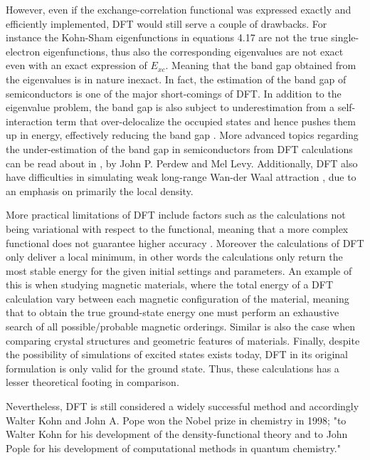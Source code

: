 However, even if the exchange-correlation functional was expressed exactly and efficiently implemented, DFT would still serve a couple of drawbacks. For instance the Kohn-Sham eigenfunctions in equations 4.17 are not the true single-electron eigenfunctions, thus also the corresponding eigenvalues are not exact even with an exact expression of $E_{xc}$. Meaning that the band gap obtained from the eigenvalues is in nature inexact. In fact, the estimation of the band gap of semiconductors is one of the major short-comings of DFT. In addition to the eigenvalue problem, the band gap is also subject to underestimation from a self-interaction term that over-delocalize the occupied states and hence pushes them up in energy, effectively reducing the band gap \cite{dft_limitations}. More advanced topics regarding the under-estimation of the band gap in semiconductors from DFT calculations can be read about in \cite{dft_bandgap}, by John P. Perdew and Mel Levy. Additionally, DFT also have difficulties in simulating weak long-range Wan-der Waal attraction \cite{dft_wdv}, due to an emphasis on primarily the local density.   

More practical limitations of DFT include factors such as the calculations not being variational with respect to the functional, meaning that a more complex functional does not guarantee higher accuracy \cite{dft_forum}. Moreover the calculations of DFT only deliver a local minimum, in other words the calculations only return the most stable energy for the given initial settings and parameters. An example of this is when studying magnetic materials, where the total energy of a DFT calculation vary between each magnetic configuration of the material, meaning that to obtain the true ground-state energy one must perform an exhaustive search of all possible/probable magnetic orderings. Similar is also the case when comparing crystal structures and geometric features of materials. Finally, despite the possibility of simulations of excited states exists today, DFT in its original formulation is only valid for the ground state. Thus, these calculations has a lesser theoretical footing in comparison.

Nevertheless, DFT is still considered a widely successful method and accordingly Walter Kohn and John A. Pope won the Nobel prize in chemistry in 1998; "to Walter Kohn for his development of the density-functional theory and to John Pople for his development of computational methods in quantum chemistry." \cite{nobelPrize}